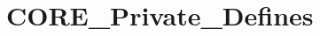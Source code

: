 \hypertarget{group___c_o_r_e___private___defines}{}\section{C\+O\+R\+E\+\_\+\+Private\+\_\+\+Defines}
\label{group___c_o_r_e___private___defines}
